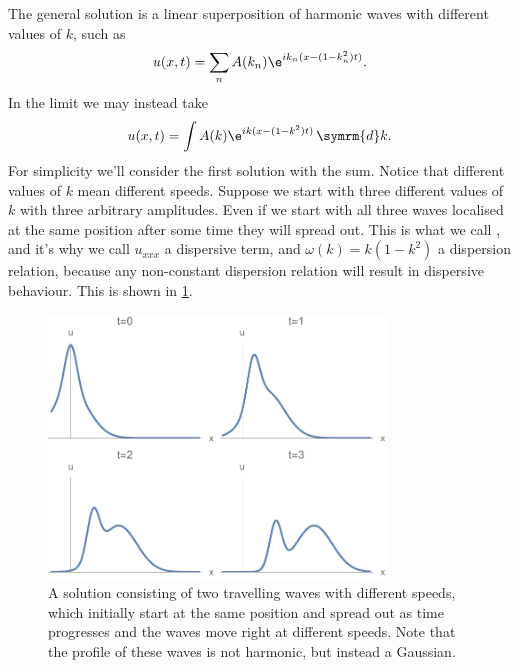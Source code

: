 \documentclass[fleqn]{NotesClass}
\renewcommand{\dd}{\,\symrm{d}}
\begin{document}
    The general solution is a linear superposition of harmonic waves with different values of \(k\), such as
    \begin{equation}
        u(x, t) = \sum_{n} A(k_n) \e^{ik_n(x - (1 - k_n^2)t)}.
    \end{equation}
    In the limit we may instead take
    \begin{equation}
        u(x, t) = \int A(k) \e^{ik(x - (1 - k^2)t)} \dd k.
    \end{equation}
    For simplicity we'll consider the first solution with the sum.
    Notice that different values of \(k\) mean different speeds.
    Suppose we start with three different values of \(k\) with three arbitrary amplitudes.
    Even if we start with all three waves localised at the same position after some time they will spread out.
    This is what we call , and it's why we call \(u_{xxx}\) a dispersive term, and \(\omega(k) = k(1 - k^2)\) a dispersion relation, because any non-constant dispersion relation will result in dispersive behaviour.
    This is shown in \cref{fig:dispersion of plane waves}.
    
    \begin{figure}
        \includegraphics[width=0.8\textwidth]{images/dispersion-of-plane-waves}
        \caption[Dispersion of plane waves]{A solution consisting of two travelling waves with different speeds, which initially start at the same position and spread out as time progresses and the waves move right at different speeds. Note that the profile of these waves is not harmonic, but instead a Gaussian.}
        \label{fig:dispersion of plane waves}
    \end{figure}
    
\end{document}
